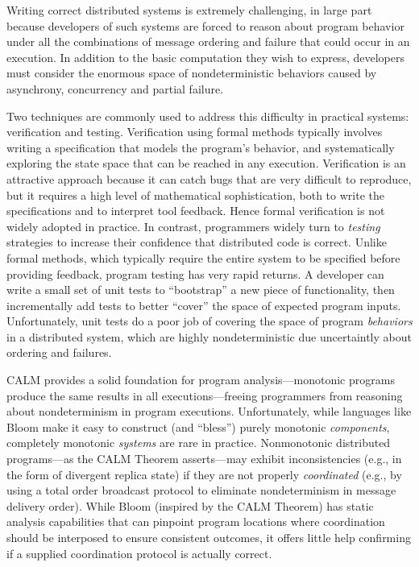 

Writing correct distributed systems is extremely challenging, in large part
because developers of such systems are forced to reason
about program behavior under all the combinations of message ordering and failure
that could occur in an execution.
In addition to the basic computation they wish to express, developers
must consider the enormous space of nondeterministic behaviors caused by 
asynchrony, concurrency and partial failure.

Two techniques are commonly used
to address this difficulty in practical systems: verification and testing.
Verification using formal methods typically involves writing a specification
that models the program's behavior, and systematically exploring the state 
space that can be reached in any execution.  Verification is an attractive 
approach because it can catch bugs that are very difficult to reproduce,
but it requires a high level of mathematical sophistication, both to write the 
specifications and to interpret tool feedback.
Hence formal verification is not widely adopted in practice.  
In contrast, programmers widely turn to \emph{testing} strategies to increase
their confidence that distributed code is correct.  Unlike formal methods, 
which typically require the entire system to be specified before providing 
feedback, program testing has very rapid returns.  A developer can write a 
small set of unit tests to ``bootstrap'' a new piece of functionality, then
incrementally add tests to better ``cover'' the space of expected program 
inputs.  Unfortunately, unit tests do a poor job of covering the space of
program \emph{behaviors} in a distributed system, which are highly
nondeterministic due uncertaintly about ordering and failures.

CALM provides a solid foundation for program analysis---monotonic programs
produce the same results in all executions---freeing programmers from reasoning
about nondeterminism in program executions.  Unfortunately, while languages
like Bloom make it easy to construct (and ``bless'') purely monotonic 
\emph{components}, completely monotonic \emph{systems} are rare in practice.
Nonmonotonic distributed programs---as the CALM Theorem asserts---may exhibit
inconsistencies (e.g., in the form of divergent replica state)
if they are not
properly \emph{coordinated} (e.g., by using a total order broadcast protocol
to eliminate nondeterminism in message delivery order).
While Bloom (inspired by the CALM Theorem) has static analysis capabilities
that can pinpoint program locations where coordination should be interposed
to ensure consistent outcomes, it offers little help confirming if a supplied
coordination protocol is actually correct.

